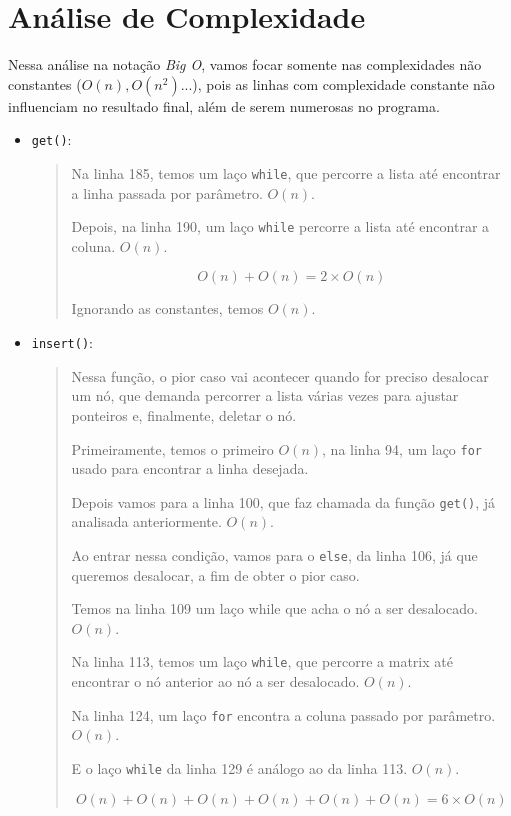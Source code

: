 \documentclass[12pt, letterpaper]{article}
\begin{document}
			\section{Análise de Complexidade} \label{complx}
			Nessa análise na notação \emph{Big O}, vamos focar somente nas complexidades não constantes ($O(n), O(n^2)$...), pois as linhas com complexidade constante não influenciam no resultado final, além de serem numerosas no programa.
			\begin{itemize}
				\item \verb|get()|:
					\begin{quote}
						Na linha 185, temos um laço \verb|while|, que percorre a lista até encontrar a linha passada por parâmetro. $O(n)$.

						Depois, na linha 190, um laço \verb|while| percorre a lista até encontrar a coluna. $O(n)$.

						\[O(n) + O(n) = 2 \times O(n)\]

						Ignorando as constantes, temos $O(n)$.
					\end{quote}

				\item \verb|insert()|:
					\begin{quote}
						Nessa função, o pior caso vai acontecer quando for preciso desalocar um nó, que demanda percorrer a lista várias vezes para ajustar ponteiros e, finalmente, deletar o nó.

						Primeiramente, temos o primeiro $O(n)$, na linha 94, um laço \verb|for| usado para encontrar a linha desejada.

						Depois vamos para a linha 100, que faz chamada da função \verb|get()|, já analisada anteriormente. $O(n)$.

						Ao entrar nessa condição, vamos para o \verb|else|, da linha 106, já que queremos desalocar, a fim de obter o pior caso.

						Temos na linha 109 um laço while que acha o nó a ser desalocado. $O(n)$.

						Na linha 113, temos um laço \verb|while|, que percorre a matrix até encontrar o nó anterior ao nó a ser desalocado. $O(n)$.

						Na linha 124, um laço \verb|for| encontra a coluna passado por parâmetro. $O(n)$.

						E o laço \verb|while| da linha 129 é análogo ao da linha 113. $O(n)$.

						\[O(n) + O(n) + O(n) + O(n) + O(n) + O(n) = 6 \times O(n)\]


\end{quote}
\end{itemize}
\end{document}
